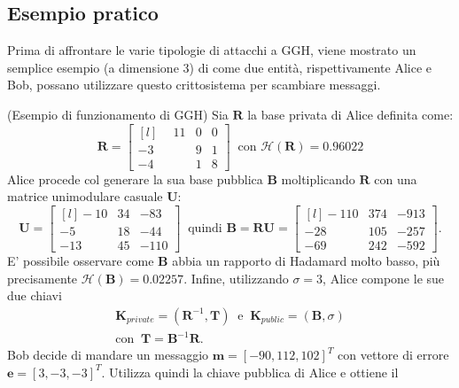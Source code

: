 \subsection{Esempio pratico}
\label{exp:GGH}
Prima di affrontare le varie tipologie di attacchi a GGH, viene mostrato un semplice esempio
(a dimensione 3) di come due entità, rispettivamente Alice e Bob, possano utilizzare questo
crittosistema per scambiare messaggi. 
\begin{exmp} (Esempio di funzionamento di GGH)
Sia $\mathbf{R}$ la base privata di Alice definita come:
\begin{equation*}
    \mathbf{R} =
    \begin{bmatrix*}[l]
        \phantom{-}11 & 0 & 0\\
                   -3 & 9 & 1\\
                   -4 & 1 & 8
    \end{bmatrix*}
    \ \text{ con } \mathcal{H}(\mathbf{R}) = 0.96022
\end{equation*}
Alice procede col generare la sua base pubblica $\mathbf{B}$ moltiplicando $\mathbf{R}$ con una matrice
unimodulare casuale $\mathbf{U}$:
\begin{equation*}
    \mathbf{U} =
    \begin{bmatrix*}[l]
        -10 & 34 & -83\\
        -5  & 18 & -44\\
        -13 & 45 & -110
    \end{bmatrix*}
    \ \text{ quindi } \mathbf{B}=\mathbf{R}\mathbf{U} =
    \begin{bmatrix*}[l]
        -110 & 374 & -913\\
        -28  & 105 & -257\\
        -69  & 242 & -592
    \end{bmatrix*}.
\end{equation*}
E' possibile osservare come $\mathbf{B}$ abbia un rapporto di Hadamard molto basso, più 
precisamente $\mathcal{H}(\mathbf{B}) = 0.02257$. Infine, utilizzando $\sigma = 3$, 
Alice compone le sue due chiavi
\begin{gather*}
    \mathbf{K}_{private} = (\mathbf{R}^{-1}, \mathbf{T}) 
    \ \text{ e } \  
    \mathbf{K}_{public} = (\mathbf{B}, \sigma)\\
    \text{con } \ \mathbf{T} = \mathbf{B}^{-1}\mathbf{R}.
\end{gather*}
Bob decide di mandare un messaggio $\mathbf{m} = [-90, 112, 102]^T$ con vettore di errore
$\mathbf{e} = [3, -3, -3]^T$. Utilizza quindi la chiave pubblica di Alice e ottiene il 

\end{exmp}
